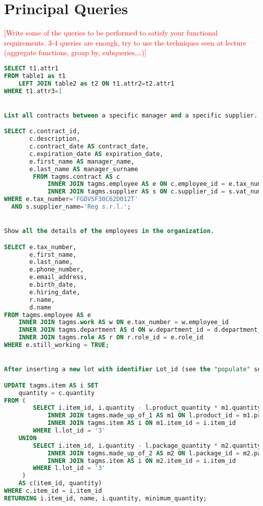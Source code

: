 \section{Principal Queries}
\textcolor{red}{[Write some of the queries to be performed to satisfy your functional requirements. 3-4 queries are enough, try to use the techniques seen at lecture (aggregate functions, group by, subqueries,…)]}

\begin{lstlisting}[language=SQL,
keywordstyle=\color{blue},
stringstyle=\color{mauve},
showstringspaces=false,
basicstyle=\ttfamily\footnotesize]
SELECT t1.attr1
FROM table1 as t1
    LEFT JOIN table2 as t2 ON t1.attr2=t2.attr1 
WHERE t1.attr3=1


List all contracts between a specific manager and a specific supplier.

SELECT c.contract_id,
       c.description,
       c.contract_date AS contract_date,
       c.expiration_date AS expiration_date,
       e.first_name AS manager_name,
       e.last_name AS manager_surname
		FROM tagms.contract AS c
		    INNER JOIN tagms.employee AS e ON c.employee_id = e.tax_number
		    INNER JOIN tagms.supplier AS s ON c.supplier_id = s.vat_number
WHERE e.tax_number='FGDVSF30C62D012T'
  AND s.supplier_name='Reg s.r.l.';


Show all the details of the employees in the organization.

SELECT e.tax_number,
       e.first_name,
       e.last_name,
       e.phone_number,
       e.email_address,
       e.birth_date,
       e.hiring_date,
       r.name,
       d.name
FROM tagms.employee AS e
    INNER JOIN tagms.work AS w ON e.tax_number = w.employee_id
    INNER JOIN tagms.department AS d ON w.department_id = d.department_id
    INNER JOIN tagms.role AS r ON r.role_id = e.role_id
WHERE e.still_working = TRUE;


After inserting a new lot with identifier Lot_id (see the "populate" section), decrease the quantity of the items involved in the production of a lot.

UPDATE tagms.item AS i SET
    quantity = c.quantity
FROM (
        SELECT i.item_id, i.quantity - l.product_quantity * m1.quantity AS quantity FROM tagms.lot AS l
            INNER JOIN tagms.made_up_of_1 AS m1 ON l.product_id = m1.product_id
            INNER JOIN tagms.item AS i ON m1.item_id = i.item_id
        WHERE l.lot_id = '3'
    UNION
        SELECT i.item_id, i.quantity - l.package_quantity * m2.quantity AS quantity FROM tagms.lot AS l
            INNER JOIN tagms.made_up_of_2 AS m2 ON l.package_id = m2.package_id
            INNER JOIN tagms.item AS i ON m2.item_id = i.item_id
        WHERE l.lot_id = '3'
     )
    AS c(item_id, quantity)
WHERE c.item_id = i.item_id
RETURNING i.item_id, name, i.quantity, minimum_quantity;



\end{lstlisting}

